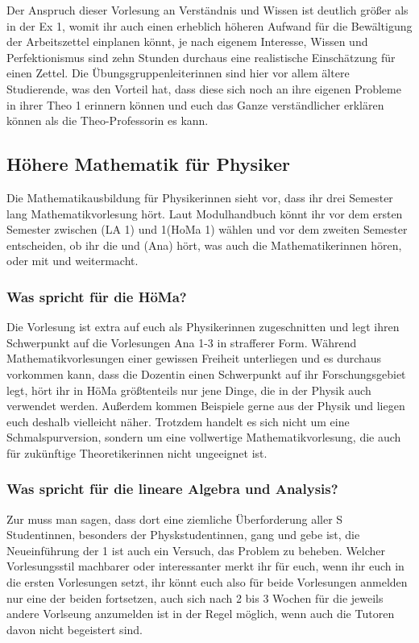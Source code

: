 Der Anspruch dieser Vorlesung an Verständnis und Wissen ist deutlich größer als in der \gls{Ex} 1, womit ihr auch einen erheblich höheren Aufwand für die Bewältigung der Arbeitszettel einplanen könnt, je nach eigenem Interesse, Wissen und Perfektionismus sind zehn Stunden durchaus eine realistische Einschätzung für einen Zettel. Die Übungsgruppenleiterinnen sind hier vor allem ältere Studierende, was den Vorteil hat, dass diese sich noch an ihre eigenen Probleme in ihrer \gls{Theo} 1 erinnern können und euch das Ganze verständlicher erklären können als die Theo-Professorin es kann.

\vspace{-2mm}
\subsection{Höhere Mathematik für Physiker}
\label{mathephysik}

Die Mathematikausbildung für Physikerinnen sieht vor, dass ihr drei Semester lang Mathematikvorlesung hört. Laut Modulhandbuch könnt ihr vor dem ersten Semester zwischen  (\gls{LA} 1) und  1(\gls{HoMa} 1) wählen und vor dem zweiten Semester entscheiden, ob ihr die  und  (\gls{Ana}) hört, was auch die Mathematikerinnen hören, oder mit  und  weitermacht.

\subsubsection{Was spricht für die HöMa?}
Die Vorlesung ist extra auf euch als Physikerinnen zugeschnitten und legt ihren Schwerpunkt auf die Vorlesungen \gls{Ana} 1-3 in strafferer Form. Während Mathematikvorlesungen einer gewissen Freiheit unterliegen und es durchaus vorkommen kann, dass die Dozentin einen Schwerpunkt auf ihr Forschungsgebiet legt, hört ihr in HöMa größtenteils nur jene Dinge, die in der Physik auch verwendet werden. Außerdem kommen Beispiele gerne aus der Physik und liegen euch deshalb vielleicht näher. Trotzdem handelt es sich nicht um eine Schmalspurversion, sondern um eine vollwertige Mathematikvorlesung, die auch für zukünftige Theoretikerinnen nicht ungeeignet ist.

\subsubsection{Was spricht für die lineare Algebra und Analysis?}
Zur  muss man sagen, dass dort eine ziemliche Überforderung aller S
Studentinnen, besonders der Physkstudentinnen, gang und gebe ist, die Neueinführung der  1 ist auch ein Versuch, das Problem zu beheben. Welcher Vorlesungsstil machbarer oder interessanter merkt ihr für euch, wenn ihr euch in die ersten Vorlesungen setzt, ihr könnt euch also für beide Vorlesungen anmelden nur eine der beiden fortsetzen, auch sich nach 2 bis 3 Wochen für die jeweils andere Vorlseung anzumelden ist in der Regel möglich, wenn auch die Tutoren davon nicht begeistert sind.\\

